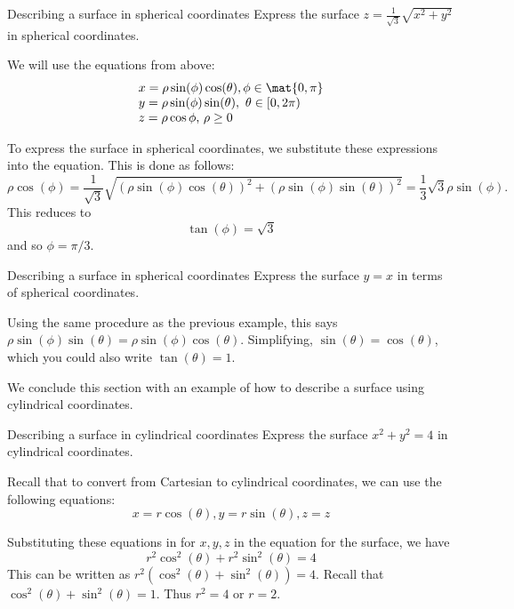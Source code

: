 \begin{example}{Describing a surface in spherical coordinates}{}
Express the surface $z=\frac{1}{\sqrt{3}}\sqrt{x^{2}+y^{2}}$ in spherical
coordinates.
\end{example}

\begin{solution}
We will use the equations from above:
\[
\begin{array}{l}
x =\rho \sin (\phi) \cos (\theta), \phi \in
\mat{0,\pi}\\
 y =\rho \sin (\phi) \sin (\theta) ,\text{ }\theta
\in \lbrack 0,2\pi ) \\
 z =\rho \cos \phi \text{, }\rho \geq 0
\end{array}
\]

To express the surface in spherical coordinates, we substitute these expressions into the equation.
This is done as follows:
\begin{equation*}
\rho \cos (\phi) =\frac{1}{\sqrt{3}}\sqrt{(\rho \sin
(\phi) \cos (\theta)) ^{2}+(\rho \sin
(\phi) \sin (\theta)) ^{2}}=\allowbreak
\frac{1}{3}\sqrt{3}\rho \sin (\phi).
\end{equation*}
This reduces to
\begin{equation*}
\tan (\phi)=\sqrt{3}
\end{equation*}
and so $\phi =\pi /3$.
\end{solution}

\begin{example}{Describing a surface in spherical coordinates}{}
Express the surface $y=x$ in terms of spherical coordinates.
\end{example}

\begin{solution}
Using the same procedure as the previous example, this says $\allowbreak \rho \sin (\phi) \sin (\theta
) =\rho \sin (\phi) \cos (\theta)$. Simplifying,  $\sin (\theta) =\cos (\theta)$, which you could also write $\tan (\theta)=1$.
\end{solution}

We conclude this section with an example of how to describe a surface using cylindrical coordinates.

\begin{example}{Describing a surface in cylindrical coordinates}{}
Express the surface $x^{2}+y^{2}=4$ in cylindrical coordinates.
\end{example}

\begin{solution}
Recall that to convert from Cartesian to cylindrical coordinates, we can use the following equations:
\[
x =r\cos (\theta) , y=r\sin (\theta) , z =z
\]

Substituting these equations in for $x,y,z$ in the equation for the surface, we have
\[
r^{2}\cos ^{2} (\theta) +r^{2}\sin ^{2} (\theta)=4
\]
This can be written as $r^2 ( \cos^{2} (\theta)+ \sin^{2} (\theta) ) = 4$. Recall that $ \cos^{2} (\theta)+ \sin^{2} (\theta)=1$.  Thus $r^{2} = 4$ or $r=2$.
\end{solution}
